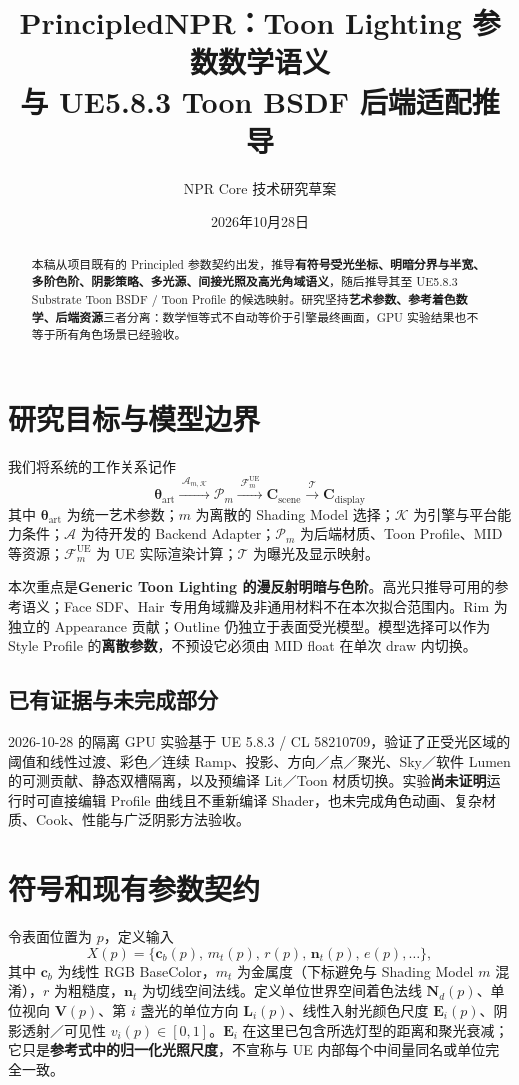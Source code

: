 \documentclass[UTF8,11pt,a4paper]{ctexart}
\title{\textbf{PrincipledNPR：Toon Lighting 参数数学语义\\与 UE5.8.3 Toon BSDF 后端适配推导}}
\author{NPR Core 技术研究草案}
\date{2026年10月28日}
\newcommand{\sue}{\mathrm{UE}}
\newcommand{\sart}{\mathrm{art}}
\numberwithin{equation}{section}
\begin{document}
\maketitle
\begin{abstract}
本稿从项目既有的 Principled 参数契约出发，推导\textbf{有符号受光坐标、明暗分界与半宽、多阶色阶、阴影策略、多光源、间接光照及高光角域语义}，随后推导其至 UE5.8.3 Substrate Toon BSDF / Toon Profile 的候选映射。研究坚持\textbf{艺术参数、参考着色数学、后端资源}三者分离：数学恒等式不自动等价于引擎最终画面，GPU 实验结果也不等于所有角色场景已经验收。
\end{abstract}
\tableofcontents
\medskip

\section{研究目标与模型边界}
我们将系统的工作关系记作
\begin{equation}
\boxed{\quad
\boldsymbol\theta_{\sart}\xrightarrow{\;\mathcal A_{m,\mathcal K}\;}
\mathcal P_m\xrightarrow{\;\mathcal F^{\sue}_{m}\;}
\mathbf C_{\mathrm{scene}}\xrightarrow{\;\mathcal T\;}
\mathbf C_{\mathrm{display}}\quad}
\label{eq:pipeline}
\end{equation}
其中 $\boldsymbol\theta_{\sart}$ 为统一艺术参数；$m$ 为离散的 Shading Model 选择；$\mathcal K$ 为引擎与平台能力条件；$\mathcal A$ 为待开发的 Backend Adapter；$\mathcal P_m$ 为后端材质、Toon Profile、MID 等资源；$\mathcal F^{\sue}_m$ 为 UE 实际渲染计算；$\mathcal T$ 为曝光及显示映射。

本次重点是\textbf{Generic Toon Lighting 的漫反射明暗与色阶}。高光只推导可用的参考语义；Face SDF、Hair 专用角域瓣及非通用材料不在本次拟合范围内。Rim 为独立的 Appearance 贡献；Outline 仍独立于表面受光模型。模型选择可以作为 Style Profile 的\textbf{离散参数}，不预设它必须由 MID float 在单次 draw 内切换。

\subsection{已有证据与未完成部分}
2026-10-28 的隔离 GPU 实验基于 UE 5.8.3 / CL 58210709，验证了正受光区域的阈值和线性过渡、彩色／连续 Ramp、投影、方向／点／聚光、Sky／软件 Lumen 的可测贡献、静态双槽隔离，以及预编译 Lit／Toon 材质切换。实验\textbf{尚未证明}运行时可直接编辑 Profile 曲线且不重新编译 Shader，也未完成角色动画、复杂材质、Cook、性能与广泛阴影方法验收。

\section{符号和现有参数契约}
令表面位置为 $p$，定义输入
\begin{equation}
X(p)=\{\mathbf c_b(p),\,m_t(p),\,r(p),\,\mathbf n_t(p),\,e(p),\ldots\},
\end{equation}
其中 $\mathbf c_b$ 为线性 RGB BaseColor，$m_t$ 为金属度（下标避免与 Shading Model $m$ 混淆），$r$ 为粗糙度，$\mathbf n_t$ 为切线空间法线。定义单位世界空间着色法线 $\mathbf N_d(p)$、单位视向 $\mathbf V(p)$、第 $i$ 盏光的单位方向 $\mathbf L_i(p)$、线性入射光颜色尺度 $\mathbf E_i(p)$、阴影透射／可见性 $v_i(p)\in[0,1]$。$\mathbf E_i$ 在这里已包含所选灯型的距离和聚光衰减；它只是\textbf{参考式中的归一化光照尺度}，不宣称与 UE 内部每个中间量同名或单位完全一致。
\end{document}
